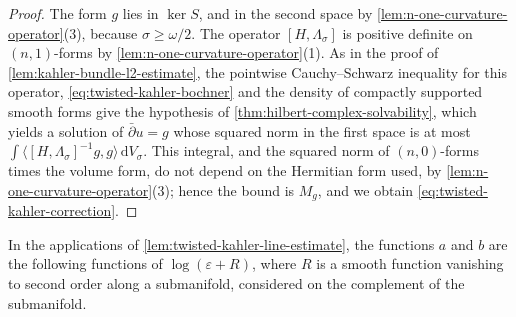 \begin{proof}
The form $g$ lies in $\ker S$, and in the second space by \cref{lem:n-one-curvature-operator}(3), because $\sigma\geq\omega/2$. The operator $[H,\Lambda_\sigma]$ is positive definite on $(n,1)$-forms by \cref{lem:n-one-curvature-operator}(1). As in the proof of \cref{lem:kahler-bundle-l2-estimate}, the pointwise Cauchy--Schwarz inequality for this operator, \eqref{eq:twisted-kahler-bochner} and the density of compactly supported smooth forms give the hypothesis of \cref{thm:hilbert-complex-solvability}, which yields a solution of $\bar\partial u=g$ whose squared norm in the first space is at most $\int\langle[H,\Lambda_\sigma]^{-1}g,g\rangle\,\mathrm dV_\sigma$. This integral, and the squared norm of $(n,0)$-forms times the volume form, do not depend on the Hermitian form used, by \cref{lem:n-one-curvature-operator}(3); hence the bound is $M_g$, and we obtain \eqref{eq:twisted-kahler-correction}.
\end{proof}

In the applications of \cref{lem:twisted-kahler-line-estimate}, the functions $a$ and $b$ are the following functions of $\log(\varepsilon+R)$, where $R$ is a smooth function vanishing to second order along a submanifold, considered on the complement of the submanifold.

